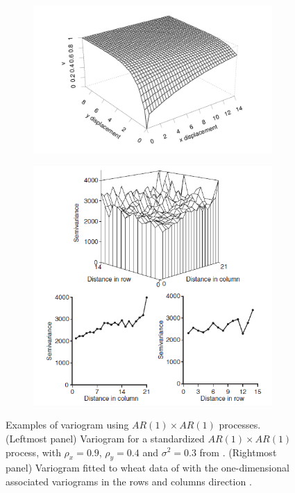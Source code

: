 \begin{figure}[hbtp]
	\centering
	\begin{subfigure}[t]{0.45\textwidth}
		\centering
		\includegraphics[width = \textwidth]{figures/Variogram-for-a-standardised-AR1AR1-process.png}
	\end{subfigure}
	\begin{subfigure}[t]{0.45\textwidth}
		\centering
		\includegraphics[width = \textwidth]{figures/AR1AR1-process-variogram-fit.PNG}
	\end{subfigure}
	\caption[Examples of variogram using $AR(1) \times AR(1)$ processes]{Examples of variogram using $AR(1) \times AR(1)$ processes.(Leftmost panel) Variogram for a standardized $AR(1) \times AR(1)$ process, with $\rho_{x} = 0.9$, $\rho_{y} = 0.4$ and $\sigma^2=0.3$ from \textcite{gilmour_accounting_1997}. (Rightmost panel) Variogram fitted to wheat data of \textcite{gilmour_accounting_1997} with the one-dimensional associated variograms in the rows and columns direction \parencite{piepho_linear_2010}. }
	\label{fig:variogram_example}
\end{figure}


